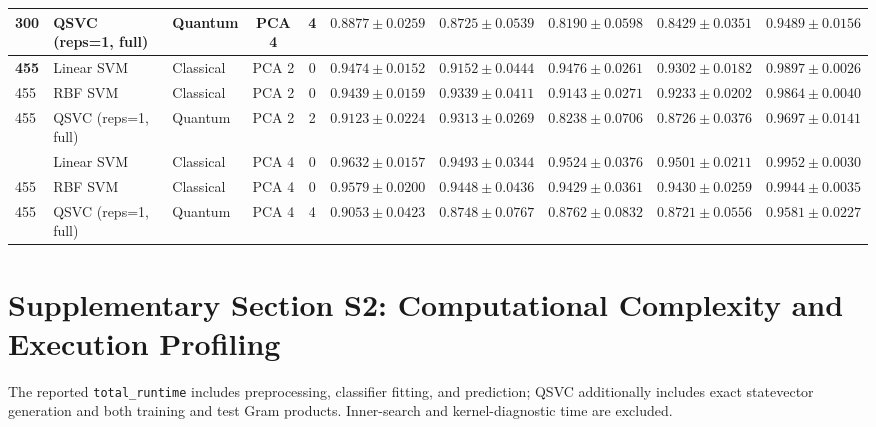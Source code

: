 \documentclass[12pt,a4paper]{article}
\begin{document}
\begin{landscape}
\begin{table}[p]
{\begin{tabular}{lllccccccc}
300 & QSVC (reps=1, full) & Quantum & PCA 4 & 4 & $0.8877 \pm 0.0259$ & $0.8725 \pm 0.0539$ & $0.8190 \pm 0.0598$ & $\mathbf{0.8429 \pm 0.0351}$ & $0.9489 \pm 0.0156$ \\
\midrule
\textbf{455} & Linear SVM & Classical & PCA 2 & 0 & $0.9474 \pm 0.0152$ & $0.9152 \pm 0.0444$ & $0.9476 \pm 0.0261$ & $\mathbf{0.9302 \pm 0.0182}$ & $0.9897 \pm 0.0026$ \\
455 & RBF SVM & Classical & PCA 2 & 0 & $0.9439 \pm 0.0159$ & $0.9339 \pm 0.0411$ & $0.9143 \pm 0.0271$ & $0.9233 \pm 0.0202$ & $0.9864 \pm 0.0040$ \\
455 & QSVC (reps=1, full) & Quantum & PCA 2 & 2 & $0.9123 \pm 0.0224$ & $0.9313 \pm 0.0269$ & $0.8238 \pm 0.0706$ & $\mathbf{0.8726 \pm 0.0376}$ & $0.9697 \pm 0.0141$ \\
\addlinespace
455 & Linear SVM & Classical & PCA 4 & 0 & $0.9632 \pm 0.0157$ & $0.9493 \pm 0.0344$ & $0.9524 \pm 0.0376$ & $\mathbf{0.9501 \pm 0.0211}$ & $0.9952 \pm 0.0030$ \\
455 & RBF SVM & Classical & PCA 4 & 0 & $0.9579 \pm 0.0200$ & $0.9448 \pm 0.0436$ & $0.9429 \pm 0.0361$ & $0.9430 \pm 0.0259$ & $0.9944 \pm 0.0035$ \\
455 & QSVC (reps=1, full) & Quantum & PCA 4 & 4 & $0.9053 \pm 0.0423$ & $0.8748 \pm 0.0767$ & $0.8762 \pm 0.0832$ & $\mathbf{0.8721 \pm 0.0556}$ & $0.9581 \pm 0.0227$ \\
\bottomrule
\end{tabular}%
}
\end{table}
\end{landscape}

\clearpage
\section*{Supplementary Section S2: Computational Complexity and Execution Profiling}

The reported \texttt{total\_runtime} includes preprocessing, classifier fitting, and prediction; QSVC additionally includes exact statevector generation and both training and test Gram products. Inner-search and kernel-diagnostic time are excluded.
\end{document}
